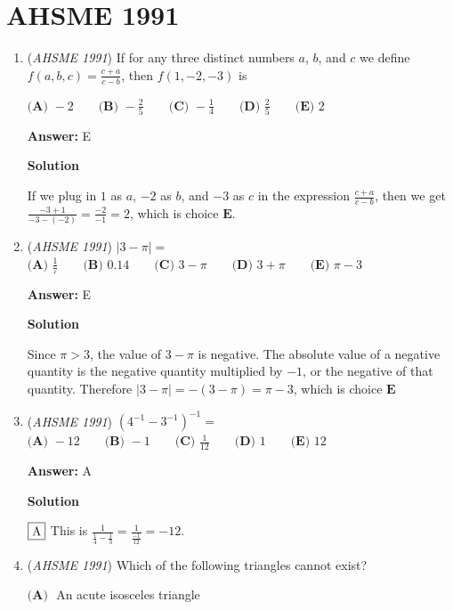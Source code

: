 \section{AHSME 1991}
        \begin{enumerate}
        	\item (\textit{AHSME 1991}) If for any three distinct numbers $a$, $b$, and $c$ we define $f(a,b,c)=\frac{c+a}{c-b}$, then $f(1,-2,-3)$ is


 $\textbf{(A) } -2 \qquad \textbf{(B) } -\frac{2}{5} \qquad \textbf{(C) } -\frac{1}{4} \qquad \textbf{(D) } \frac{2}{5} \qquad \textbf {(E) } 2$

 \textbf{Answer: }E



\textbf{Solution}

If we plug in $1$ as $a$, $-2$ as $b$, and $-3$ as $c$ in the expression $\frac{c+a}{c-b}$, then we get $\frac{-3+1}{-3-(-2)}=\frac{-2}{-1}=2$, which is choice $\boxed{\textbf{E}}$.

 


	\item (\textit{AHSME 1991}) $|3-\pi|=$
$\textbf{(A) }\frac{1}{7} \qquad \textbf{(B) }0.14 \qquad \textbf{(C) }3-\pi \qquad \textbf{(D) }3+\pi \qquad \textbf{(E) }\pi-3$

 \textbf{Answer: }E



\textbf{Solution}

Since $\pi>3$, the value of $3-\pi$ is negative. The absolute value of a negative quantity is the negative quantity multiplied by $-1$, or the negative of that quantity. Therefore $|3-\pi|=-(3-\pi)=\pi-3$, which is choice $\boxed{\textbf{E}}$



	\item (\textit{AHSME 1991}) $(4^{-1}-3^{-1})^{-1}=$
$\textbf{(A) }-12 \qquad \textbf{(B) }-1 \qquad \textbf{(C) }\frac{1}{12} \qquad \textbf{(D) }1 \qquad \textbf{(E) }12$

 \textbf{Answer: }A



\textbf{Solution}

$\fbox{A}$ This is $\frac{1}{\frac{1}{4} - \frac{1}{3}} = \frac{1}{\frac{-1}{12}} = -12.$



	\item (\textit{AHSME 1991}) Which of the following triangles cannot exist?


 $\textbf{(A) }$ An acute isosceles triangle



\end{enumerate}
